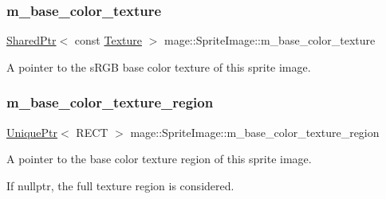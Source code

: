\subsubsection{\texorpdfstring{m\+\_\+base\+\_\+color\+\_\+texture}{m\_base\_color\_texture}}
{\footnotesize\ttfamily \hyperlink{namespacemage_a1e01ae66713838a7a67d30e44c67703e}{Shared\+Ptr}$<$ const \hyperlink{classmage_1_1_texture}{Texture} $>$ mage\+::\+Sprite\+Image\+::m\+\_\+base\+\_\+color\+\_\+texture\hspace{0.3cm}{\ttfamily [private]}}

A pointer to the s\+R\+GB base color texture of this sprite image. \hypertarget{classmage_1_1_sprite_image_ab921e099c41323969c86f7bac9c81f4f}{}\label{classmage_1_1_sprite_image_ab921e099c41323969c86f7bac9c81f4f} 
\subsubsection{\texorpdfstring{m\+\_\+base\+\_\+color\+\_\+texture\+\_\+region}{m\_base\_color\_texture\_region}}
{\footnotesize\ttfamily \hyperlink{namespacemage_a3316d7143a973e37adf1110f2e80ca31}{Unique\+Ptr}$<$ R\+E\+CT $>$ mage\+::\+Sprite\+Image\+::m\+\_\+base\+\_\+color\+\_\+texture\+\_\+region\hspace{0.3cm}{\ttfamily [private]}}

A pointer to the base color texture region of this sprite image.

If {\ttfamily nullptr}, the full texture region is considered. 